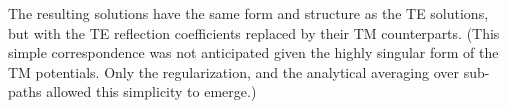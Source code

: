 The resulting solutions have the same form and structure as the TE solutions, but with 
the TE reflection coefficients replaced by their TM counterparts.  
(This simple correspondence was not anticipated given the highly singular form of the TM potentials.  
Only the regularization, and the analytical averaging over sub-paths allowed this simplicity to emerge.)

